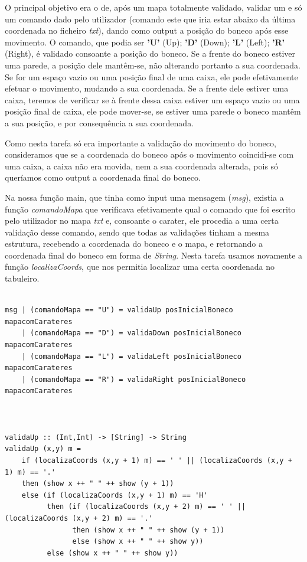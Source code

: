 \documentclass[a4paper]{article}
\begin{document}
O principal objetivo era o de, após um mapa totalmente validado, validar um e só um comando dado pelo utilizador (comando este que iria estar abaixo da última coordenada no ficheiro \textit{txt}), dando como output a posição do boneco após esse movimento. O comando, que podia ser \textbf{'U'} (Up); \textbf{'D'} (Down); \textbf{'L'} (Left); \textbf{'R'} (Right), é validado consoante a posição do boneco. Se a frente do boneco estiver uma parede, a posição dele mantêm-se, não alterando portanto a sua coordenada. Se for um espaço vazio ou uma posição final de uma caixa, ele pode efetivamente efetuar o movimento, mudando a sua coordenada. Se a frente dele estiver uma caixa, teremos de verificar se à frente dessa caixa estiver um espaço vazio ou uma posição final de caixa, ele pode mover-se, se estiver uma parede o boneco mantêm a sua posição, e por consequência a sua coordenada. \par 
Como nesta tarefa só era importante a validação do movimento do boneco, consideramos que se a coordenada do boneco após o movimento coincidi-se com uma caixa, a caixa não era movida, nem a sua coordenada alterada, pois só queríamos como output a coordenada final do boneco. \par
Na nossa função main, que tinha como input uma mensagem (\textit{msg}), existia a função \textit{comandoMapa} que verificava efetivamente qual o comando que foi escrito pelo utilizador no mapa \textit{txt} e, consoante o carater, ele procedia a uma certa validação desse comando, sendo que todas as validações tinham a mesma estrutura, recebendo a coordenada do boneco e o mapa, e retornando a coordenada final do boneco em forma de \textit{String}. Nesta tarefa usamos novamente a função \textit{localizaCoords}, que nos permitia localizar uma certa coordenada no tabuleiro. \par


\begin{Verbatim}

msg | (comandoMapa == "U") = validaUp posInicialBoneco mapacomCarateres
    | (comandoMapa == "D") = validaDown posInicialBoneco mapacomCarateres
    | (comandoMapa == "L") = validaLeft posInicialBoneco mapacomCarateres
    | (comandoMapa == "R") = validaRight posInicialBoneco mapacomCarateres



validaUp :: (Int,Int) -> [String] -> String
validaUp (x,y) m = 
    if (localizaCoords (x,y + 1) m) == ' ' || (localizaCoords (x,y + 1) m) == '.'
    then (show x ++ " " ++ show (y + 1))
    else (if (localizaCoords (x,y + 1) m) == 'H' 
          then (if (localizaCoords (x,y + 2) m) == ' ' || (localizaCoords (x,y + 2) m) == '.'
                then (show x ++ " " ++ show (y + 1)) 
                else (show x ++ " " ++ show y))
          else (show x ++ " " ++ show y))

\end{Verbatim}
\end{document}
